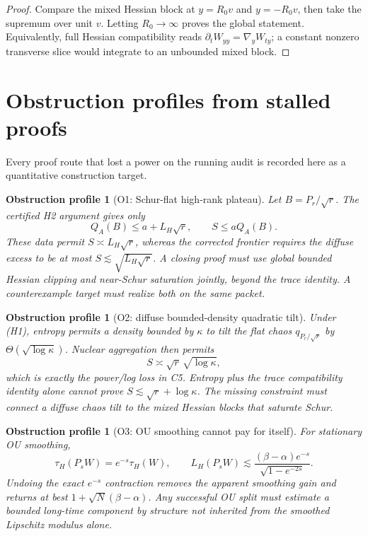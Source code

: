 \documentclass[11pt]{article}
\numberwithin{equation}{section}
\newtheorem{obstruction}[theorem]{Obstruction profile}
\begin{document}
\begin{proof}
Compare the mixed Hessian block at $y=R_0v$ and $y=-R_0v$, then take the
supremum over unit $v$.  Letting $R_0\to\infty$ proves the global statement.
Equivalently, full Hessian compatibility reads
$\partial_tW_{yy}=\nabla_yW_{ty}$; a constant nonzero transverse slice would
integrate to an unbounded mixed block.
\end{proof}

\section{Obstruction profiles from stalled proofs}\label{sec:obstructions}

Every proof route that lost a power on the running audit is recorded here as
a quantitative construction target.

\begin{obstruction}[O1: Schur-flat high-rank plateau]
Let $B=P_r/\sqrt r$.  The certified H2 argument gives only
\begin{equation}\label{eq:O1}
 Q_A(B)\le a+L_H\sqrt r,\qquad S\le aQ_A(B).
\end{equation}
These data permit $S\asymp L_H\sqrt r$, whereas the corrected frontier
requires the diffuse excess to be at most
$S\lesssim\sqrt{L_H\sqrt r}$.  A closing proof must use global bounded
Hessian clipping and near-Schur saturation jointly, beyond the trace
identity.  A counterexample target must realize both on the same packet.
\end{obstruction}

\begin{obstruction}[O2: diffuse bounded-density quadratic tilt]
Under (H1), entropy permits a density bounded by $\kappa$ to tilt the flat
chaos $q_{P_r/\sqrt r}$ by $\Theta(\sqrt{\log\kappa})$.  Nuclear aggregation
then permits
\begin{equation}\label{eq:O2}
 S\asymp\sqrt r\,\sqrt{\log\kappa},
\end{equation}
which is exactly the power/log loss in C5.  Entropy plus the trace
compatibility identity alone cannot prove $S\lesssim\sqrt r+\log\kappa$.
The missing constraint must connect a diffuse chaos tilt to the mixed
Hessian blocks that saturate Schur.
\end{obstruction}

\begin{obstruction}[O3: OU smoothing cannot pay for itself]
For stationary OU smoothing,
\begin{equation}\label{eq:O3}
 \tau_H(P_sW)=e^{-s}\tau_H(W),\qquad
 L_H(P_sW)\lesssim
 \frac{(\beta-\alpha)e^{-s}}{\sqrt{1-e^{-2s}}}.
\end{equation}
Undoing the exact $e^{-s}$ contraction removes the apparent smoothing gain
and returns at best $1+\sqrt N(\beta-\alpha)$.  Any successful OU split must
estimate a bounded long-time component by structure not inherited from the
smoothed Lipschitz modulus alone.
\end{obstruction}
\end{document}
